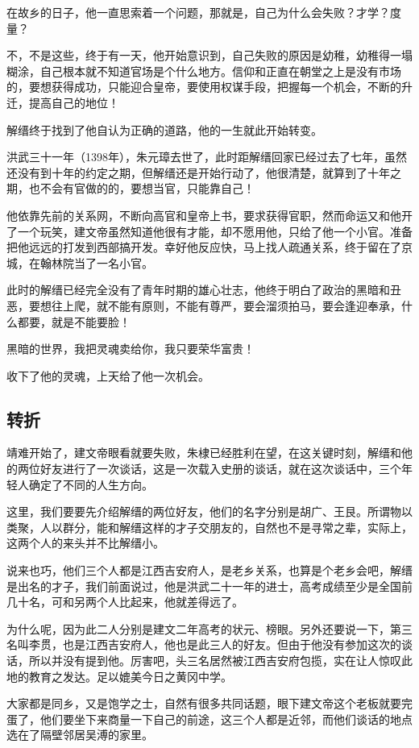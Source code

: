 \begin{multicols}{\theparacolNo}
在故乡的日子，他一直思索着一个问题，那就是，自己为什么会失败？才学？度量？

不，不是这些，终于有一天，他开始意识到，自己失败的原因是幼稚，幼稚得一塌糊涂，自己根本就不知道官场是个什么地方。信仰和正直在朝堂之上是没有市场的，要想获得成功，只能迎合皇帝，要使用权谋手段，把握每一个机会，不断的升迁，提高自己的地位！

解缙终于找到了他自认为正确的道路，他的一生就此开始转变。

洪武三十一年（1398年），朱元璋去世了，此时距解缙回家已经过去了七年，虽然还没有到十年的约定之期，但解缙还是开始行动了，他很清楚，就算到了十年之期，也不会有官做的的，要想当官，只能靠自己！

他依靠先前的关系网，不断向高官和皇帝上书，要求获得官职，然而命运又和他开了一个玩笑，建文帝虽然知道他很有才能，却不愿用他，只给了他一个小官。准备把他远远的打发到西部搞开发。幸好他反应快，马上找人疏通关系，终于留在了京城，在翰林院当了一名小官。

此时的解缙已经完全没有了青年时期的雄心壮志，他终于明白了政治的黑暗和丑恶，要想往上爬，就不能有原则，不能有尊严，要会溜须拍马，要会逢迎奉承，什么都要，就是不能要脸！

黑暗的世界，我把灵魂卖给你，我只要荣华富贵！

收下了他的灵魂，上天给了他一次机会。

\subsection{转折}
靖难开始了，建文帝眼看就要失败，朱棣已经胜利在望，在这关键时刻，解缙和他的两位好友进行了一次谈话，这是一次载入史册的谈话，就在这次谈话中，三个年轻人确定了不同的人生方向。

这里，我们要要先介绍解缙的两位好友，他们的名字分别是胡广、王艮。所谓物以类聚，人以群分，能和解缙这样的才子交朋友的，自然也不是寻常之辈，实际上，这两个人的来头并不比解缙小。

说来也巧，他们三个人都是江西吉安府人，是老乡关系，也算是个老乡会吧，解缙是出名的才子，我们前面说过，他是洪武二十一年的进士，高考成绩至少是全国前几十名，可和另两个人比起来，他就差得远了。

为什么呢，因为此二人分别是建文二年高考的状元、榜眼。另外还要说一下，第三名叫李贯，也是江西吉安府人，他也是此三人的好友。但由于他没有参加这次的谈话，所以并没有提到他。厉害吧，头三名居然被江西吉安府包揽，实在让人惊叹此地的教育之发达。足以媲美今日之黄冈中学。

大家都是同乡，又是饱学之士，自然有很多共同话题，眼下建文帝这个老板就要完蛋了，他们要坐下来商量一下自己的前途，这三个人都是近邻，而他们谈话的地点选在了隔壁邻居吴溥的家里。


\end{multicols}
